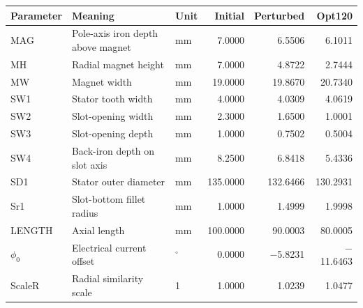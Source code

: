 \begin{tabular}{l>{\raggedright\arraybackslash}p{.28\linewidth}lrrr}\toprule
Parameter & Meaning & Unit & Initial & Perturbed & Opt120\\\midrule
MAG & Pole-axis iron depth above magnet & mm & 7.0000 & 6.5506 & 6.1011 \\
MH & Radial magnet height & mm & 7.0000 & 4.8722 & 2.7444 \\
MW & Magnet width & mm & 19.0000 & 19.8670 & 20.7340 \\
SW1 & Stator tooth width & mm & 4.0000 & 4.0309 & 4.0619 \\
SW2 & Slot-opening width & mm & 2.3000 & 1.6500 & 1.0001 \\
SW3 & Slot-opening depth & mm & 1.0000 & 0.7502 & 0.5004 \\
SW4 & Back-iron depth on slot axis & mm & 8.2500 & 6.8418 & 5.4336 \\
SD1 & Stator outer diameter & mm & 135.0000 & 132.6466 & 130.2931 \\
Sr1 & Slot-bottom fillet radius & mm & 1.0000 & 1.4999 & 1.9998 \\
LENGTH & Axial length & mm & 100.0000 & 90.0003 & 80.0005 \\
$\phi_0$ & Electrical current offset & $^\circ$ & 0.0000 & $-$5.8231 & $-$11.6463 \\
ScaleR & Radial similarity scale & 1 & 1.0000 & 1.0239 & 1.0477 \\
\bottomrule\end{tabular}
